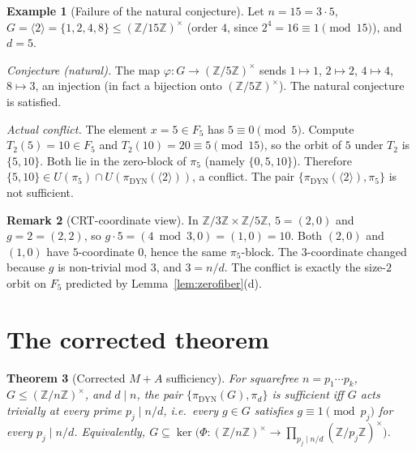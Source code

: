 \documentclass[11pt,reqno]{amsart}
\theoremstyle{plain}
\newtheorem{theorem}{Theorem}
\theoremstyle{definition}
\newtheorem{remark}[theorem]{Remark}
\newtheorem{example}[theorem]{Example}
\newcommand{\Z}{\mathbb{Z}}
\newcommand{\Zns}{(\Z/n\Z)^{\times}}
\newcommand{\DYN}{\mathrm{DYN}}
\begin{document}
\begin{example}[Failure of the natural conjecture] \label{ex:n15}
Let $n = 15 = 3 \cdot 5$, $G = \langle 2 \rangle = \{1,2,4,8\} \leq (\Z/15\Z)^{\times}$ (order $4$, since $2^4 = 16 \equiv 1 \pmod{15}$), and $d = 5$.

\emph{Conjecture (natural).} The map $\varphi \colon G \to (\Z/5\Z)^{\times}$ sends $1 \mapsto 1$, $2 \mapsto 2$, $4 \mapsto 4$, $8 \mapsto 3$, an injection (in fact a bijection onto $(\Z/5\Z)^{\times}$). The natural conjecture is satisfied.

\emph{Actual conflict.} The element $x = 5 \in F_5$ has $5 \equiv 0 \pmod 5$. Compute $T_2(5) = 10 \in F_5$ and $T_2(10) = 20 \equiv 5 \pmod{15}$, so the orbit of $5$ under $T_2$ is $\{5, 10\}$. Both lie in the zero-block of $\pi_5$ (namely $\{0, 5, 10\}$). Therefore $\{5, 10\} \in U(\pi_5) \cap U(\pi_{\DYN}(\langle 2 \rangle))$, a conflict. The pair $\{\pi_{\DYN}(\langle 2 \rangle), \pi_5\}$ is not sufficient.
\end{example}

\begin{remark}[CRT-coordinate view]
In $\Z/3\Z \times \Z/5\Z$, $5 = (2, 0)$ and $g = 2 = (2, 2)$, so $g \cdot 5 = (4 \bmod 3, 0) = (1, 0) = 10$. Both $(2, 0)$ and $(1, 0)$ have $5$-coordinate $0$, hence the same $\pi_5$-block. The $3$-coordinate changed because $g$ is non-trivial mod $3$, and $3 = n/d$. The conflict is exactly the size-$2$ orbit on $F_5$ predicted by Lemma~\ref{lem:zerofiber}(d).
\end{remark}

\section{The corrected theorem}

\begin{theorem}[Corrected $M{+}A$ sufficiency] \label{thm:corrMA}
For squarefree $n = p_1 \cdots p_k$, $G \leq \Zns$, and $d \mid n$, the pair $\{\pi_{\DYN}(G), \pi_d\}$ is sufficient iff $G$ acts trivially at every prime $p_j \mid n/d$, i.e.\ every $g \in G$ satisfies $g \equiv 1 \pmod{p_j}$ for every $p_j \mid n/d$. Equivalently, $G \subseteq \ker\bigl(\Phi \colon \Zns \to \prod_{p_j \mid n/d} (\Z/p_j\Z)^{\times}\bigr)$.
\end{theorem}
\end{document}
